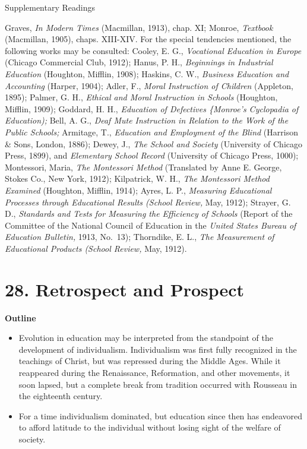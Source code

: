 \documentclass[]{book}
\providecommand{\tightlist}{%
  \setlength{\itemsep}{0pt}\setlength{\parskip}{0pt}}
\begin{document}
Supplementary Readings

Graves, \emph{In Modern Times} (Macmillan, 1913), chap. XI; Monroe, \emph{Textbook} (Macmillan, 1905), chaps. XIII-XIV. For the special tendencies mentioned, the following works may be consulted: Cooley, E. G., \emph{Vocational Education in Europe} (Chicago Commercial Club, 1912); Hanus, P. H., \emph{Beginnings in Industrial Education} (Houghton, Mifflin, 1908); Haskins, C. W., \emph{Business Education and Accounting} (Harper, 1904); Adler, F., \emph{Moral Instruction of Children} (Appleton, 1895); Palmer, G. H., \emph{Ethical and Moral Instruction in Schools} (Houghton, Mifflin, 1909); Goddard, H. H., \emph{Education of Defectives \{Monroe's Cyclopadia of Education);} Bell, A. G., \emph{Deaf Mute Instruction in Relation to the Work of the Public Schools;} Armitage, T., \emph{Education and Employment of the Blind} (Harrison \& Sons, London, 1886); Dewey, J., \emph{The School and Society} (University of Chicago Press, 1899), and \emph{Elementary School Record} (University of Chicago Press, 1000); Montessori, Maria, \emph{The Montessori Method} (Translated by Anne E. George, Stokes Co., New York, 1912); Kilpatrick, W. H., \emph{The Montessori Method Examined} (Houghton, Mifflin, 1914); Ayres, L. P., \emph{Measuring Educational Processes through Educational Results (School Review,} May, 1912); Strayer, G. D., \emph{Standards and Tests for Measuring the Efficiency of Schools} (Report of the Committee of the National Council of Education in the \emph{United States Bureau of Education Bulletin,} 1913, No.~13); Thorndike, E. L., \emph{The Measurement of Educational Products (School Review,} May, 1912).

\hypertarget{retrospect-and-prospect}{%
\chapter{28. Retrospect and Prospect}\label{retrospect-and-prospect}}

\textbf{Outline}

\begin{itemize}
\tightlist
\item
  Evolution in education may be interpreted from the standpoint of the development of individualism. Individualism was first fully recognized in the teachings of Christ, but was repressed during the Middle Ages. While it reappeared during the Renaissance, Reformation, and other movements, it soon lapsed, but a complete break from tradition occurred with Rousseau in the eighteenth century.
\item
  For a time individualism dominated, but education since then has endeavored to afford latitude to the individual without losing sight of the welfare of society.
\end{itemize}
\end{document}
